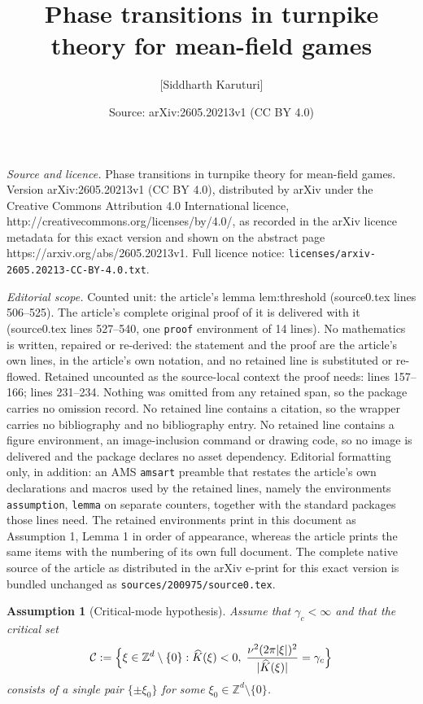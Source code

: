 \documentclass[10pt,a4paper]{amsart}
\title{Phase transitions in turnpike theory for mean-field games}
\author{[Siddharth Karuturi]}
\date{Source: arXiv:2605.20213v1 (CC BY 4.0)}
\newtheorem{assumption}{Assumption}
\newcommand{\Kh}{\widehat{K}}
\newcommand{\Zd}{\mathbb{Z}^d}
\newcommand{\cC}{\mathcal{C}}
\newcommand{\gamc}{\gamma_c}
\begin{document}
\maketitle

\noindent\emph{Source and licence.} Phase transitions in turnpike theory for mean-field games. Version arXiv:2605.20213v1 (CC BY 4.0), distributed by arXiv under the Creative Commons Attribution 4.0 International licence, http://creativecommons.org/licenses/by/4.0/, as recorded in the arXiv licence metadata for this exact version and shown on the abstract page https://arxiv.org/abs/2605.20213v1. Full licence notice: \texttt{licenses/arxiv-2605.20213-CC-BY-4.0.txt}.\par\smallskip

\noindent\textit{Editorial scope.} Counted unit: the article's lemma lem:threshold (source0.tex lines 506--525). The article's complete original proof of it is delivered with it (source0.tex lines 527--540, one \texttt{proof} environment of 14 lines). No mathematics is written, repaired or re-derived: the statement and the proof are the article's own lines, in the article's own notation, and no retained line is substituted or re-flowed.  Retained uncounted as the source-local context the proof needs: lines 157--166; lines 231--234.  Nothing was omitted from any retained span, so the package carries no omission record.  No retained line contains a citation, so the wrapper carries no bibliography and no bibliography entry.  No retained line contains a figure environment, an image-inclusion command or drawing code, so no image is delivered and the package declares no asset dependency.  Editorial formatting only, in addition: an AMS \texttt{amsart} preamble that restates the article's own declarations and macros used by the retained lines, namely the environments \texttt{assumption}, \texttt{lemma} on separate counters, together with the standard packages those lines need.  The retained environments print in this document as Assumption 1, Lemma 1 in order of appearance, whereas the article prints the same items with the numbering of its own full document.  The complete native source of the article as distributed in the arXiv e-print for this exact version is bundled unchanged as \texttt{sources/200975/source0.tex}.
\begin{assumption}[Critical-mode hypothesis]
\label{ass:critical-mode}
Assume that $\gamc<\infty$ and that the critical set
\[
\cC :=
\Bigl\{\xi\in\Zd\setminus\{0\}:\Kh(\xi)<0,\;
\frac{\nu^2(2\pi|\xi|)^2}{|\Kh(\xi)|}=\gamc\Bigr\}
\]
consists of a single pair $\{\pm \xi_0\}$ for some $\xi_0\in\Zd\setminus\{0\}$.
\end{assumption}
\end{document}
